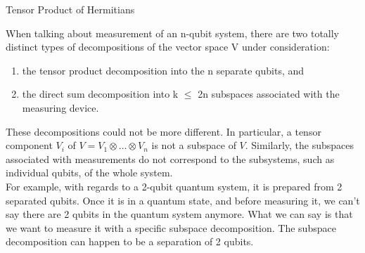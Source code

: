 \documentclass{beamer}
\begin{document}
\begin{frame}{Tensor Product of Hermitians}
{    \vspace{0.2cm}
    When talking about measurement of an n-qubit system, there are two totally distinct types of
    decompositions of the vector space V under consideration:\\
    \begin{enumerate}[I]
      \item the tensor product decomposition into the n separate qubits, and
      \item the direct sum decomposition into k $\leq$ 2n subspaces associated with the measuring device. 
    \end{enumerate}
    These decompositions could not be more different.
    In particular, a tensor component $V_i$ of $V = V_1 \otimes \dots \otimes V_n$ is not a subspace of $V$.
    Similarly, the subspaces associated with measurements do not correspond to the subsystems,
    such as individual qubits, of the whole system.\\
    \vspace{0.2cm}
    For example, with regards to a 2-qubit quantum system, it is prepared from 2 separated qubits. 
    Once it is in a quantum state, and before measuring it, we can't say there are 2 qubits in the quantum system anymore.
    What we can say is that we want to measure it with a specific subspace decomposition.
    The subspace decomposition can happen to be a separation of 2 qubits.

  }%
\end{frame}
\end{document}
